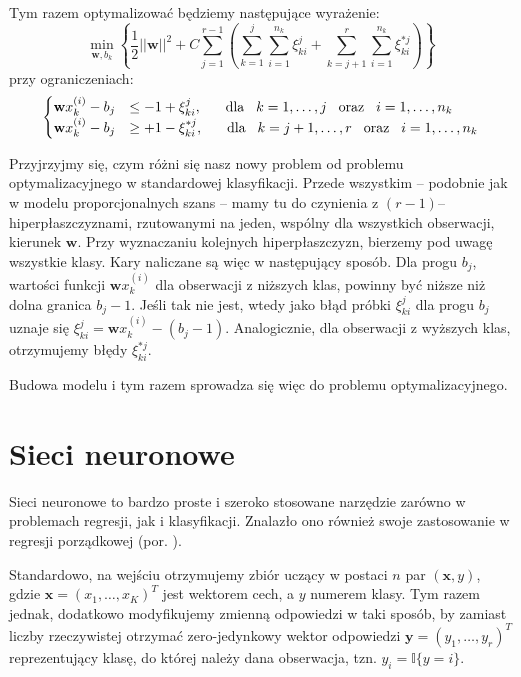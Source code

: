 \documentclass{mini}
\begin{document}
Tym razem optymalizować będziemy następujące wyrażenie:
$$
\min_{\textbf{w}, b_k}\left\lbrace \dfrac{1}{2}||\textbf{w}||^2+C\sum_{j=1}^{r-1}\left( \sum_{k=1}^{j}\sum_{i=1}^{n_k}\xi_{ki}^j+\sum_{k=j+1}^{r}\sum_{i=1}^{n_k}\xi_{ki}^{*j}\right)\right\rbrace
$$
przy ograniczeniach:
$$
\begin{cases}
\textbf{w}x^{(i)}_k-b_j&\leq -1 +\xi^j_{ki}, \hspace{6mm} \textrm{dla}\hspace{3mm} k=1,\ldots,j \hspace{3mm}\textrm{oraz}\hspace{3mm} i=1,\ldots,n_k \\
\textbf{w}x^{(i)}_k-b_j&\geq +1 -\xi^{*j}_{ki}, \hspace{6mm} \textrm{dla}\hspace{3mm} k=j+1,\ldots,r \hspace{3mm}\textrm{oraz}\hspace{3mm} i=1,\ldots,n_k 
\end{cases}
$$

Przyjrzyjmy się, czym różni się nasz nowy problem od problemu optymalizacyjnego w standardowej klasyfikacji. Przede wszystkim -- podobnie jak w modelu proporcjonalnych szans -- mamy tu do czynienia z $(r-1)$--hiperpłaszczyznami, rzutowanymi na jeden, wspólny dla wszystkich obserwacji, kierunek $\mathbf{w}$. Przy wyznaczaniu kolejnych hiperpłaszczyzn, bierzemy pod uwagę wszystkie klasy. Kary naliczane są więc w następujący sposób. Dla progu $b_j$, wartości funkcji $\textbf{w}x^{(i)}_k$ dla obserwacji z niższych klas, powinny być niższe niż dolna granica $b_j-1$. Jeśli tak nie jest, wtedy jako błąd próbki $\xi^j_{ki}$ dla progu $b_j$ uznaje się $\xi^j_{ki} = \textbf{w}x^{(i)}_k-(b_j - 1)$. Analogicznie, dla obserwacji z wyższych klas, otrzymujemy błędy $\xi^{*j}_{ki}$.

Budowa modelu i tym razem sprowadza się więc do problemu optymalizacyjnego.

\section{Sieci neuronowe}
 
Sieci neuronowe to bardzo proste i szeroko stosowane narzędzie zarówno w problemach regresji, jak i klasyfikacji. Znalazło ono również swoje zastosowanie w regresji porządkowej (por. \cite{nna}). 

Standardowo, na wejściu otrzymujemy zbiór uczący w postaci $n$ par $(\textbf{x},y)$, gdzie $\textbf{x} = (x_1, \ldots, x_K)^T$ jest wektorem cech, a $y$ numerem klasy. Tym razem jednak, dodatkowo modyfikujemy zmienną odpowiedzi w taki sposób, by zamiast liczby rzeczywistej otrzymać zero-jedynkowy wektor odpowiedzi $\textbf{y} = (y_1, \ldots, y_r)^T$ reprezentujący klasę, do której należy dana obserwacja, tzn. $y_i = \mathbb{I}\lbrace y =i \rbrace$.
\end{document}
